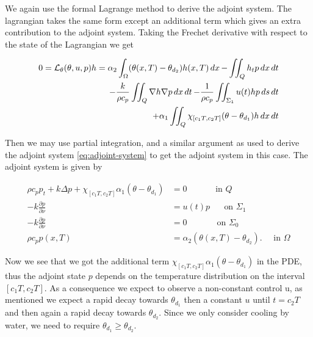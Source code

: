 We again use the formal Lagrange method to derive the adjoint system. The lagrangian takes the same form except an additional term which gives an extra contribution to the adjoint system. Taking the Frechet derivative with respect to the state of the Lagrangian we get

\begin{equation}
  \begin{aligned}
  0 = \mathcal{L}_\theta(\theta, u, p)h = \alpha_2 \int_\Omega (\theta(x,T) - \theta_{d_2})h(x, T)\mathop{dx} - \iint_Q h_t p\mathop{dx}\mathop{dt} \\
  - \frac{k}{\rho c_p}\iint_Q\nabla h\nabla p \mathop{dx}\mathop{dt}
  - \frac{1}{\rho c_p}\iint_{\Sigma_1} u(t)h p\mathop{ds}\mathop{dt} \\
  + \alpha_1 \iint_{Q}\chi_{[c_1T,c_2T]}(\theta - \theta_{d_1})h \mathop{dx}\mathop{dt}
  \end{aligned}
\end{equation}

Then we may use partial integration, and a similar argument as used to derive the adjoint system \eqref{eq:adjoint-system} to get the adjoint system in this case. The adjoint system is given by 

\begin{subequations}
   \begin{align*} 
      \rho c_p p_t + k\Delta p + \chi_{[c_1T,c_2T]}\alpha_1(\theta - \theta_{d_1})&= 0 \quad\qquad\textrm{ in } Q  \\
      {-k}\frac{\partial p}{\partial\nu} &= u(t)p \,\,\quad\textrm{ on } \Sigma_1  \\
      {-k}\frac{\partial p}{\partial\nu} &= 0 \,\quad\qquad\textrm{ on } \Sigma_0  \\
      \rho c_p p(x, T) &= \alpha_2(\theta(x, T) - \theta_{d_2}). \quad \textrm{ in } \Omega
   \end{align*}
\end{subequations}

Now we see that we got the additional term $\chi_{[c_1T,c_2T]}\alpha_1(\theta-\theta_{d_1})$ in the PDE, thus the adjoint state $p$ depends on the temperature distribution on the interval $[c_1T,c_2T]$. As a consequence we expect to observe a non-constant control u, as mentioned we expect a rapid decay towards $\theta_{d_1}$ then a constant $u$ until $t=c_2T$ and then again a rapid decay towards $\theta_{d_2}$. Since we only consider cooling by water, we need to require $\theta_{d_1} \geq \theta_{d_2}$.